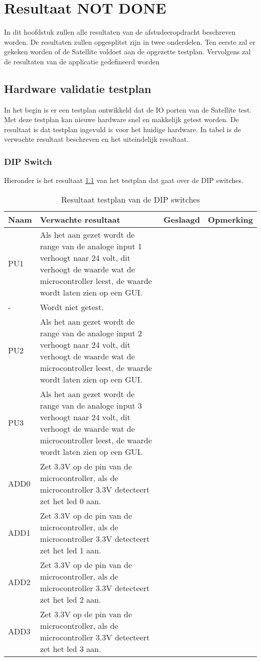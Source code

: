 \chapter{Resultaat NOT DONE}
In dit hoofdstuk zullen alle resultaten van de afstudeeropdracht beschreven worden. De resultaten zullen opgesplitst zijn in twee onderdelen. Ten eerste zal er gekeken worden of de Satellite voldoet aan de opgezette testplan. Vervolgens zal de resultaten van de applicatie gedefineerd worden

\section{Hardware validatie testplan}
In het begin is er een testplan ontwikkeld dat de IO porten van de Satellite test. Met deze testplan kan nieuwe hardware snel en makkelijk getest worden. De resultaat is dat testplan ingevuld is voor het huidige hardware. In tabel is de verwachte resultaat beschreven en het uiteindelijk resultaat.

\subsection{DIP Switch}
Hieronder is het resultaat \ref{tab:resultaatdip} van het testplan dat gaat over de DIP switches. 
\begin{table}[h!]
	\centering
	\caption{Resultaat testplan van de DIP switches}
	\begin{tabular}{lp{8.5cm}lp{4cm}}
	\toprule
	\textbf{Naam} 	& \textbf{Verwachte resultaat} & \textbf{Geslaagd} & \textbf{Opmerking}\\ \toprule
	PU1				& Als het aan gezet wordt de range van de analoge input 1 verhoogt naar 24 volt, dit verhoogt de waarde wat de microcontroller leest, de waarde wordt laten zien op een GUI. &\\
	-				& Wordt niet getest. & \\ 
	PU2				& Als het aan gezet wordt de range van de analoge input 2 verhoogt naar 24 volt, dit verhoogt de waarde wat de microcontroller leest, de waarde wordt laten zien op een GUI. &\\
	PU3				& Als het aan gezet wordt de range van de analoge input 3 verhoogt  naar 24 volt, dit verhoogt de waarde wat de microcontroller leest, de waarde wordt laten zien op een GUI. & \\
	ADD0 			& Zet 3.3V op de pin van de microcontroller, als de microcontroller 3.3V detecteert zet het led 0 aan. & \\
	ADD1 			& Zet 3.3V op de pin van de microcontroller, als de microcontroller 3.3V detecteert zet het led 1 aan. & \\
	ADD2 			& Zet 3.3V op de pin van de microcontroller, als de microcontroller 3.3V detecteert zet het led 2 aan. & \\
	ADD3 			& Zet 3.3V op de pin van de microcontroller, als de microcontroller 3.3V detecteert zet het led 3 aan. & \\ \bottomrule
	\end{tabular}
	\label{tab:resultaatdip}
\end{table}

